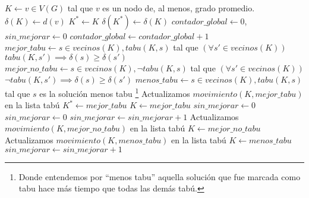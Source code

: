 \begin{pseudocodigo}
    \Else
        \State $K \gets v \in V(G)$ tal que $v$ es un nodo de, al menos, grado promedio.
        \State $\delta(K) \gets d(v)$
        \State $K^* \gets K$
        \State $\delta(K^*) \gets \delta(K)$
        \State $contador\_global \gets 0$, $sin\_mejorar \gets 0$
        \Statex
            \Statex
            \State $contador\_global \gets contador\_global+1$
            \Statex
            \State $mejor\_tabu \gets s \in vecinos(K), tabu(K,s)$ tal que
            \Statex\hspace{3cm}$(\forall s' \in vecinos(K))$ $tabu(K,s') \implies \delta(s) \geq \delta(s')$
            \Statex
            \State $mejor\_no\_tabu \gets s \in vecinos(K), \neg tabu(K,s)$ tal que
            \Statex\hspace{3cm}$(\forall s' \in vecinos(K))$ $\neg tabu(K,s') \implies \delta(s) \geq \delta(s')$
            \Statex
            \State $menos\_tabu \gets s \in vecinos(K), tabu(K,s)$ tal que $s$ es la soluci\'on menos tabu%
                \footnote{Donde entendemos por ``menos tabu'' aquella soluci\'on que fue marcada como
                tabu hace m\'as tiempo que todas las dem\'as tab\'u.}
            \Statex
             
                \Statex
                \State Actualizamos $movimiento(K,mejor\_tabu)$ en la lista tab\'u
                \State $K^* \gets mejor\_tabu$
                \State $K \gets mejor\_tabu$
                \State $sin\_mejorar \gets 0$
                \Statex
                    \State $sin\_mejorar \gets 0$
                \Else
                    \State $sin\_mejorar \gets sin\_mejorar+1$
                \EndIf
                \State Actualizamos $movimiento(K,mejor\_no\_tabu)$ en la lista tab\'u
                \State $K \gets mejor\_no\_tabu$
                \Statex
            \Else {}
                \State Actualizamos $movimiento(K,menos\_tabu)$ en la lista tab\'u
                \State $K \gets menos\_tabu$
                \State $sin\_mejorar \gets sin\_mejorar+1$
            \EndIf
        \EndWhile

    \EndIf

    \State {}
\end{pseudocodigo}

